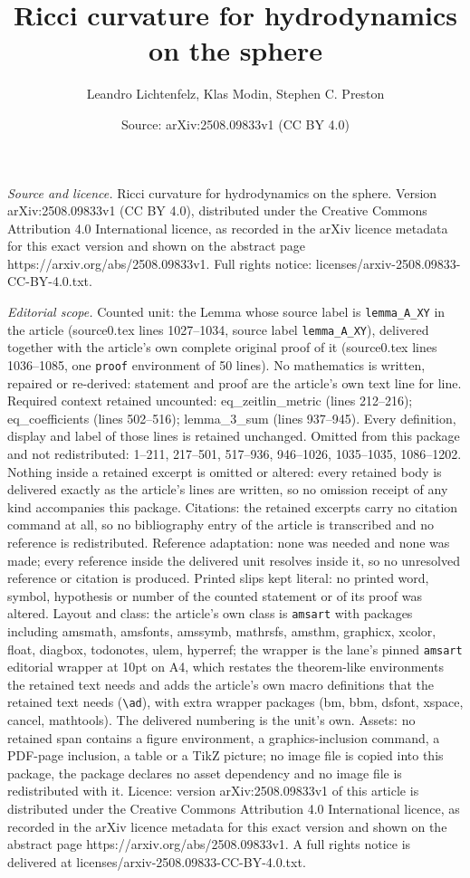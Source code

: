 \documentclass[10pt,a4paper]{amsart}
\title[Ricci curvature for hydrodynamics on the sphere]{Ricci curvature for hydrodynamics on the sphere}
\author{Leandro Lichtenfelz, Klas Modin, Stephen C. Preston}
\date{Source: arXiv:2508.09833v1 (CC BY 4.0)}
\begin{document}
\maketitle

\noindent\emph{Source and licence.} Ricci curvature for hydrodynamics on the sphere. Version arXiv:2508.09833v1 (CC BY 4.0), distributed under the Creative Commons Attribution 4.0 International licence, as recorded in the arXiv licence metadata for this exact version and shown on the abstract page https://arxiv.org/abs/2508.09833v1. Full rights notice: licenses/arxiv-2508.09833-CC-BY-4.0.txt.\par\smallskip

\noindent\textit{Editorial scope.} Counted unit: the Lemma whose source label is \texttt{lemma\_A\_XY} in the article (source0.tex lines 1027--1034, source label \texttt{lemma\_A\_XY}), delivered together with the article's own complete original proof of it (source0.tex lines 1036--1085, one \texttt{proof} environment of 50 lines). No mathematics is written, repaired or re-derived: statement and proof are the article's own text line for line. Required context retained uncounted: eq\_zeitlin\_metric (lines 212--216); eq\_coefficients (lines 502--516); lemma\_3\_sum (lines 937--945). Every definition, display and label of those lines is retained unchanged. Omitted from this package and not redistributed: 1--211, 217--501, 517--936, 946--1026, 1035--1035, 1086--1202. Nothing inside a retained excerpt is omitted or altered: every retained body is delivered exactly as the article's lines are written, so no omission receipt of any kind accompanies this package. Citations: the retained excerpts carry no citation command at all, so no bibliography entry of the article is transcribed and no reference is redistributed. Reference adaptation: none was needed and none was made; every reference inside the delivered unit resolves inside it, so no unresolved reference or citation is produced. Printed slips kept literal: no printed word, symbol, hypothesis or number of the counted statement or of its proof was altered. Layout and class: the article's own class is \texttt{amsart} with packages including amsmath, amsfonts, amssymb, mathrsfs, amsthm, graphicx, xcolor, float, diagbox, todonotes, ulem, hyperref; the wrapper is the lane's pinned \texttt{amsart} editorial wrapper at 10pt on A4, which restates the theorem-like environments the retained text needs and adds the article's own macro definitions that the retained text needs (\texttt{\textbackslash ad}), with extra wrapper packages (bm, bbm, dsfont, xspace, cancel, mathtools). The delivered numbering is the unit's own. Assets: no retained span contains a figure environment, a graphics-inclusion command, a PDF-page inclusion, a table or a TikZ picture; no image file is copied into this package, the package declares no asset dependency and no image file is redistributed with it. Licence: version arXiv:2508.09833v1 of this article is distributed under the Creative Commons Attribution 4.0 International licence, as recorded in the arXiv licence metadata for this exact version and shown on the abstract page https://arxiv.org/abs/2508.09833v1. A full rights notice is delivered at licenses/arxiv-2508.09833-CC-BY-4.0.txt. 
\end{document}
